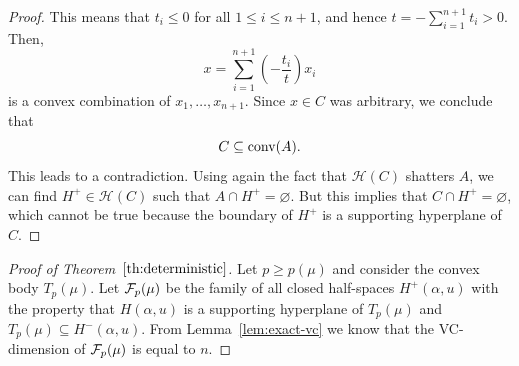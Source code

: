 \documentclass[11pt,leqno]{article}
\theoremstyle{definition}
\theoremstyle{remark}
\numberwithin{equation}{section}
\newcommand{\ls}{\leqslant}
\newcommand{\gr}{\geqslant}
\newcommand{\1}{\textbf{1}}
\begin{document}
\begin{proof}
This means that $t_i\ls 0$ for all $1\ls i\ls n+1$, and hence $t=-\sum_{i=1}^{n+1}t_i>0$. Then,
$$x=\sum_{i=1}^{n+1}\left(-\frac{t_i}{t}\right)x_i$$
is a convex combination of $x_1,\ldots ,x_{n+1}$. Since $x\in C$ was arbitrary, we conclude that
$$C\subseteq {\rm conv}(A).$$
This leads to a contradiction. Using again the fact that $\mathcal{H}(C)$ shatters $A$, we can find $H^+\in\mathcal{H}(C)$
such that $A\cap H^+=\varnothing$. But this implies that $C\cap H^+=\varnothing$, which cannot be true
because the boundary of $H^+$ is a supporting hyperplane of $C$.
\end{proof}


\begin{proof}[Proof of Theorem~$\ref{th:deterministic}$]Let $p\gr p(\mu)$ and consider the convex body $T_p(\mu)$.
Let ${\cal F}_p(\mu)$ be the family of all closed half-spaces $H^+(\alpha,u)$
with the property that $H(\alpha,u)$ is a supporting hyperplane of $T_p(\mu)$ and $T_p(\mu)\subseteq H^-(\alpha,u)$.
From Lemma~\ref{lem:exact-vc} we know that the VC-dimension of ${\cal F}_p(\mu)$ is equal to $n$.


\end{proof}
\end{document}

